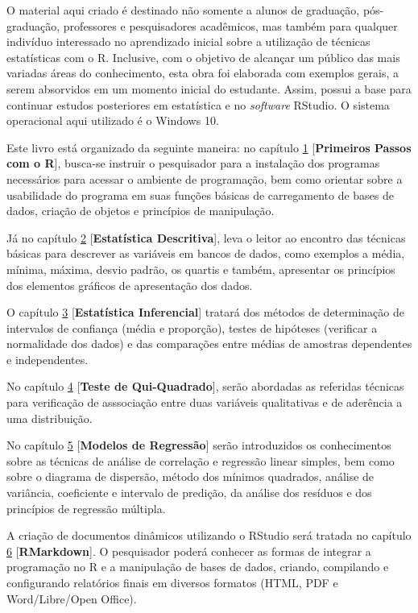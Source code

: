 \documentclass[12pt,brazil,oneside]{book}
\begin{document}
O material aqui criado é destinado não somente a alunos de graduação,
pós-graduação, professores e pesquisadores acadêmicos, mas também para
qualquer indivíduo interessado no aprendizado inicial sobre a utilização
de técnicas estatísticas com o R. Inclusive, com o objetivo de alcançar
um público das mais variadas áreas do conhecimento, esta obra foi
elaborada com exemplos gerais, a serem absorvidos em um momento inicial
do estudante. Assim, possui a base para continuar estudos posteriores em
estatística e no \emph{software} RStudio. O sistema operacional aqui
utilizado é o Windows 10.

Este livro está organizado da seguinte maneira: no capítulo
\protect\hyperlink{intro}{1} {[}\textbf{Primeiros Passos com o R}{]},
busca-se instruir o pesquisador para a instalação dos programas
necessários para acessar o ambiente de programação, bem como orientar
sobre a usabilidade do programa em suas funções básicas de carregamento
de bases de dados, criação de objetos e princípios de manipulação.

Já no capítulo \protect\hyperlink{desc}{2} {[}\textbf{Estatística
Descritiva}{]}, leva o leitor ao encontro das técnicas básicas para
descrever as variáveis em bancos de dados, como exemplos a média,
mínima, máxima, desvio padrão, os quartis e também, apresentar os
princípios dos elementos gráficos de apresentação dos dados.

O capítulo \protect\hyperlink{inf}{3} {[}\textbf{Estatística
Inferencial}{]} tratará dos métodos de determinação de intervalos de
confiança (média e proporção), testes de hipóteses (verificar a
normalidade dos dados) e das comparações entre médias de amostras
dependentes e independentes.

No capítulo \protect\hyperlink{qui}{4} {[}\textbf{Teste de
Qui-Quadrado}{]}, serão abordadas as referidas técnicas para verificação
de asssociação entre duas variáveis qualitativas e de aderência a uma
distribuição.

No capítulo \protect\hyperlink{reg}{5} {[}\textbf{Modelos de
Regressão}{]} serão introduzidos os conhecimentos sobre as técnicas de
análise de correlação e regressão linear simples, bem como sobre o
diagrama de dispersão, método dos mínimos quadrados, análise de
variância, coeficiente e intervalo de predição, da análise dos resíduos
e dos princípios de regressão múltipla.

A criação de documentos dinâmicos utilizando o RStudio será tratada no
capítulo \protect\hyperlink{rmark}{6} {[}\textbf{RMarkdown}{]}. O
pesquisador poderá conhecer as formas de integrar a programação no R e a
manipulação de bases de dados, criando, compilando e configurando
relatórios finais em diversos formatos (HTML, PDF e Word/Libre/Open
Office).
\end{document}
